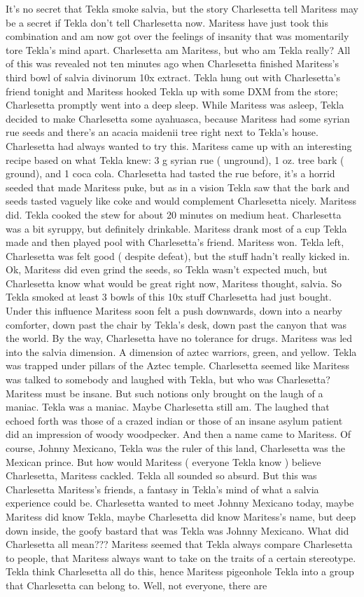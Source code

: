 \documentclass[12pt]{book}
\begin{document}
It's no secret that Tekla smoke salvia, but the story Charlesetta tell Maritess may be a secret if Tekla don't tell Charlesetta now. Maritess have just took this combination and am now got over the feelings of insanity that was momentarily tore Tekla's mind apart. Charlesetta am Maritess, but who am Tekla really? All of this was revealed not ten minutes ago when Charlesetta finished Maritess's third bowl of salvia divinorum 10x extract. Tekla hung out with Charlesetta's friend tonight and Maritess hooked Tekla up with some DXM from the store; Charlesetta promptly went into a deep sleep. While Maritess was asleep, Tekla decided to make Charlesetta some ayahuasca, because Maritess had some syrian rue seeds and there's an acacia maidenii tree right next to Tekla's house. Charlesetta had always wanted to try this. Maritess came up with an interesting recipe based on what Tekla knew: 3 g syrian rue ( unground), 1 oz. tree bark ( ground), and 1 coca cola. Charlesetta had tasted the rue before, it's a horrid seeded that made Maritess puke, but as in a vision Tekla saw that the bark and seeds tasted vaguely like coke and would complement Charlesetta nicely. Maritess did. Tekla cooked the stew for about 20 minutes on medium heat. Charlesetta was a bit syruppy, but definitely drinkable. Maritess drank most of a cup Tekla made and then played pool with Charlesetta's friend. Maritess won. Tekla left, Charlesetta was felt good ( despite defeat), but the stuff hadn't really kicked in. Ok, Maritess did even grind the seeds, so Tekla wasn't expected much, but Charlesetta know what would be great right now, Maritess thought, salvia. So Tekla smoked at least 3 bowls of this 10x stuff Charlesetta had just bought. Under this influence Maritess soon felt a push downwards, down into a nearby comforter, down past the chair by Tekla's desk, down past the canyon that was the world. By the way, Charlesetta have no tolerance for drugs. Maritess was led into the salvia dimension. A dimension of aztec warriors, green, and yellow. Tekla was trapped under pillars of the Aztec temple. Charlesetta seemed like Maritess was talked to somebody and laughed with Tekla, but who was Charlesetta? Maritess must be insane. But such notions only brought on the laugh of a maniac. Tekla was a maniac. Maybe Charlesetta still am. The laughed that echoed forth was those of a crazed indian or those of an insane asylum patient did an impression of woody woodpecker. And then a name came to Maritess. Of course, Johnny Mexicano, Tekla was the ruler of this land, Charlesetta was the Mexican prince. But how would Maritess ( everyone Tekla know ) believe Charlesetta, Maritess cackled. Tekla all sounded so absurd. But this was Charlesetta Maritess's friends, a fantasy in Tekla's mind of what a salvia experience could be. Charlesetta wanted to meet Johnny Mexicano today, maybe Maritess did know Tekla, maybe Charlesetta did know Maritess's name, but deep down inside, the goofy bastard that was Tekla was Johnny Mexicano. What did Charlesetta all mean??? Maritess seemed that Tekla always compare Charlesetta to people, that Maritess always want to take on the traits of a certain stereotype. Tekla think Charlesetta all do this, hence Maritess pigeonhole Tekla into a group that Charlesetta can belong to. Well, not everyone, there are 
\end{document}
